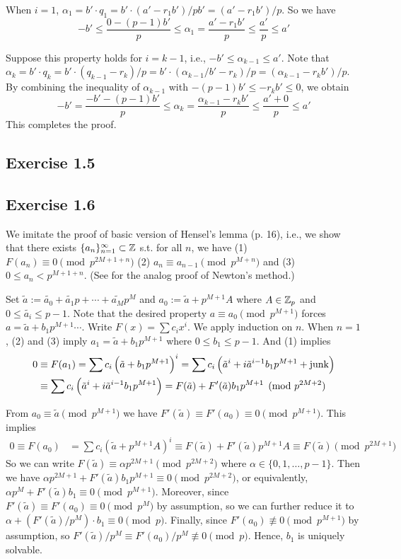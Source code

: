 \documentclass[../Koblitz.tex]{subfiles}
\begin{document}
When $i=1$, $\alpha_1=b'\cdot q_1=b'\cdot(a'-r_1b')/pb'=(a'-r_1b')/p$. So we have $$-b'\leq\frac{0-(p-1)b'}{p}\leq\alpha_1 = \frac{a'-r_1b'}{p} \leq \frac{a'}{p} \leq a'$$

Suppose this property holds for $i=k-1$, i.e., $-b'\leq\alpha_{k-1}\leq a'$. Note that $\alpha_k=b'\cdot q_k=b'\cdot(q_{k-1}-r_k)/p=b'\cdot(\alpha_{k-1}/b'-r_k)/p=(\alpha_{k-1}-r_kb')/p$. By combining the inequality of $\alpha_{k-1}$ with $-(p-1)b'\leq -r_kb'\leq 0$, we obtain $$-b'=\frac{-b'-(p-1)b'}{p} \leq \alpha_k=\frac{\alpha_{k-1}-r_kb'}{p} \leq \frac{a'+0}{p} \leq a'$$ This completes the proof.

\subsection*{Exercise 1.5}

\subsection*{Exercise 1.6}

We imitate the proof of basic version of Hensel's lemma (p. 16), i.e., we show that there exists $\{a_n\}_{n=1}^\infty\subset\mathbb{Z}$ s.t. for all $n$, we have (1) $F(a_n)\equiv0 \pmod{p^{2M+1+n}}$ (2) $a_n\equiv a_{n-1} \pmod{p^{M+n}}$ and (3) $0\leq a_n < p^{M+1+n}$. (See  for the analog proof of Newton's method.)

Set $\tilde{a}:=\tilde{a_0}+\tilde{a_1}p+\cdots+\tilde{a_M}p^M$ and $a_0 := \tilde{a} + p^{M+1}A$ where $A\in\mathbb{Z}_p$ and $0\leq\tilde{a_i}\leq p-1$. Note that the desired property $a\equiv a_0 \pmod{p^{M+1}}$ forces $a=\tilde{a}+b_1p^{M+1}\cdots$. Write $F(x)=\sum c_ix^i$. We apply induction on $n$. When $n=1$, (2) and (3) imply $a_1=\tilde{a}+b_1p^{M+1}$ where $0\leq b_1 \leq p-1$. And (1) implies
\begin{align*}
0 &\equiv F(a_1) = \sum c_i\left(\tilde{a}+b_1p^{M+1}\right)^i = \sum c_i\left(\tilde{a}^i+i\tilde{a}^{i-1}b_1p^{M+1}+\operatorname{junk}\right) \\
&\equiv \sum c_i\left(\tilde{a}^i+i\tilde{a}^{i-1}b_1p^{M+1}\right) = F(\tilde{a}) + F'(\tilde{a})b_1p^{M+1} \pmod{p^{2M+2}}
\end{align*}

From $a_0 \equiv \tilde{a} \pmod{p^{M+1}}$ we have $F'(\tilde{a})\equiv F'(a_0) \equiv 0 \pmod{p^{M+1}}$. This implies
\begin{align*}
0\equiv F(a_0) &= \sum c_i\left(\tilde{a} + p^{M+1}A\right)^i \equiv F(\tilde{a}) + F'(\tilde{a})p^{M+1}A \equiv F(\tilde{a}) \pmod{p^{2M+1}}
\end{align*}
So we can write $F(\tilde{a})\equiv \alpha p^{2M+1} \pmod{p^{2M+2}}$ where $\alpha\in\{0,1,\ldots,p-1\}$. Then we have $\alpha p^{2M+1} + F'(\tilde{a})b_1p^{M+1} \equiv 0 \pmod{p^{2M+2}}$, or equivalently, $\alpha p^M+F'(\tilde{a})b_1\equiv 0\pmod{p^{M+1}}$. Moreover, since $F'(\tilde{a})\equiv F'(a_0)\equiv 0 \pmod{p^M}$ by assumption, so we can further reduce it to $\alpha+(F'(\tilde{a})/p^M)\cdot b_1 \equiv 0\pmod{p}$. Finally, since $F'(a_0)\not\equiv 0 \pmod{p^{M+1}}$ by assumption, so $F'(\tilde{a})/p^M \equiv F'(a_0)/p^M\not\equiv 0 \pmod{p}$. Hence, $b_1$ is uniquely solvable.
\end{document}
